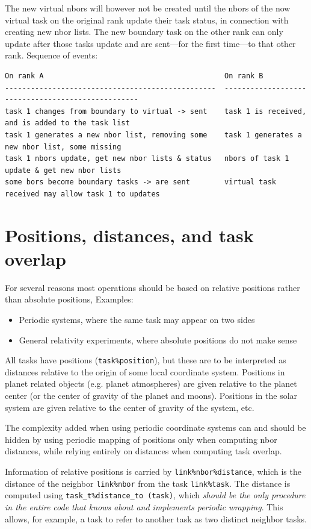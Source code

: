 \documentclass[paper=a4,fontsize=11pt]{scrartcl}
\numberwithin{equation}{section}		%
\numberwithin{figure}{section}			%
\numberwithin{table}{section}				%
\newcommand{\codecolor}{\color{Blue}}
\newcommand{\Code}[1]{{\codecolor\texttt{#1}}}
\begin{document}
The new virtual nbors will however not be created until the nbors of the now virtual task on the original rank update their task status, in connection with creating new nbor lists. The new boundary task on the other rank can only update after those tasks update and are sent---for the first time---to that other rank.   Sequence of events:

{\footnotesize\codecolor\begin{verbatim}
On rank A                                          On rank B
-------------------------------------------------  --------------------------------------------------
task 1 changes from boundary to virtual -> sent    task 1 is received, and is added to the task list
task 1 generates a new nbor list, removing some    task 1 generates a new nbor list, some missing
task 1 nbors update, get new nbor lists & status   nbors of task 1 update & get new nbor lists
some bors become boundary tasks -> are sent        virtual task received may allow task 1 to updates
\end{verbatim}}

\section{Positions, distances, and task overlap}
For several reasons most operations should be based on relative positions rather than absolute positions,  Examples:
\begin{itemize}
    \item Periodic systems, where the same task may appear on two sides
    \item General relativity experiments, where absolute positions do not make sense
\end{itemize}
All tasks have positions (\Code{task\%position}), but these are to be interpreted as distances relative to the origin of some local coordinate system.  Positions in planet related objects (e.g. planet atmospheres) are given relative to the planet center (or the center of gravity of the planet and moons).   Positions in the solar system are given relative to the center of gravity of the system, etc.

The complexity added when using periodic coordinate systems can and should be hidden by using periodic mapping of positions only when computing nbor distances, while relying entirely on distances when computing task overlap.

Information of relative positions is carried by \Code{link\%nbor\%distance}, which is the distance of the neighbor \Code{link\%nbor} from the task \Code{link\%task}.  The distance is computed using \Code{task\_t\%distance\_to (task)}, which \textit{should be the only procedure in the entire code that knows about and implements periodic wrapping}. This allows, for example, a task to refer to another task as two distinct neighbor tasks.  
\end{document}
